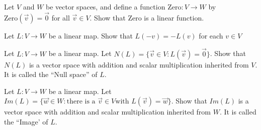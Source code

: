 \begin{question}
	Let $V$ and $W$ be vector spaces, and define a function $\mathrm{Zero}: V \to W$ by $\mathrm{Zero}(\vec{v}) = \vec{0}$ for all $\vec{v} \in V$.  Show that 
	$\mathrm{Zero}$ is a linear function. 
\end{question}

\begin{question}
	Let $L:V \to W$ be a linear map. Show that $L(-v) = -L(v)$ for each $v\in V$
\end{question}

\begin{question}
	Let $L:V \to W$ be a linear map.  Let $N(L) = \{ \vec{v} \in V : L(\vec{v}) = \vec{0}\}$.  Show that $N(L)$ is a vector space with addition and scalar multiplication
	inherited from $V$.  It is called the ``Null space'' of $L$.
\end{question}

\begin{question}
	Let $L:V \to W$ be a linear map.  Let $Im(L) = \{ \vec{w} \in W : \text{there is a }\vec{v} \in V \text{with } L(\vec{v}) = \vec{w}\}$. 
	 Show that $Im(L)$ is a vector space with addition and scalar multiplication
	inherited from $W$.  It is called the ``Image' of $L$.
\end{question}



